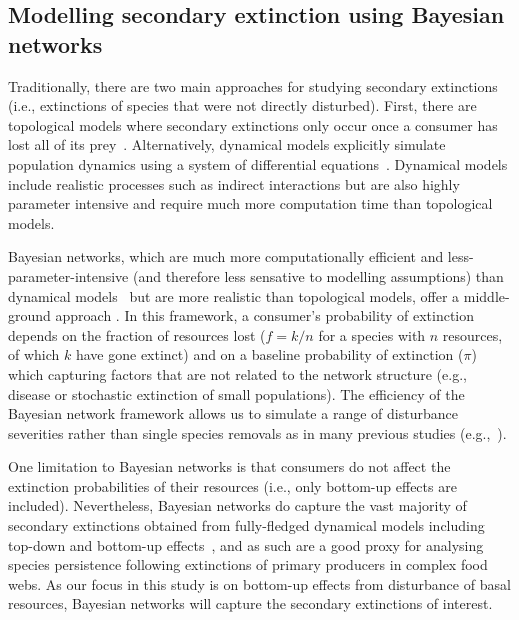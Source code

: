 \documentclass[12pt]{article}
\begin{document}
\begin{spacing}{2.0}
    
    \subsection*{Modelling secondary extinction using Bayesian networks}


        Traditionally, there are two main approaches for studying secondary extinctions (i.e., extinctions of species that were not directly disturbed). 
        First, there are topological models where secondary extinctions only occur once a consumer has lost all of its prey~\citep{dunne2009cascading}. 
        Alternatively, dynamical models explicitly simulate population dynamics using a system of differential equations~\citep{binzer2011susceptibility}. 
        Dynamical models include realistic processes such as indirect interactions but are also highly parameter intensive and require much more computation time than topological models. 
        
        
        Bayesian networks, which are much more computationally efficient and less-parameter-intensive (and therefore less sensative to modelling assumptions) than dynamical models~\citep{Eklof2013} but are more realistic than topological models, offer a middle-ground approach \citep{Eklof2013,Haussler2020}. 
        In this framework, a consumer's probability of extinction depends on the fraction of resources lost ($f = k/n$ for a species with $n$ resources, of which $k$ have gone extinct) and on a baseline probability of extinction ($\pi$) which capturing factors that are not related to the network structure (e.g., disease or stochastic extinction of small populations).
        The efficiency of the Bayesian network framework allows us to simulate a range of disturbance severities rather than single species removals as in many previous studies (e.g.,~\citealp[]{Memmott2004,Staniczenko2010,Cirtwill2022Oikos}).


        One limitation to Bayesian networks is that consumers do not affect the extinction probabilities of their resources (i.e., only bottom-up effects are included).
        Nevertheless, Bayesian networks do capture the vast majority of secondary extinctions obtained from fully-fledged dynamical models including top-down and bottom-up effects~\citep{Eklof2013}, and as such are a good proxy for analysing species persistence following extinctions of primary producers in complex food webs.
        As our focus in this study is on bottom-up effects from disturbance of basal resources, Bayesian networks will capture the secondary extinctions of interest.


\end{spacing}
\end{document}
